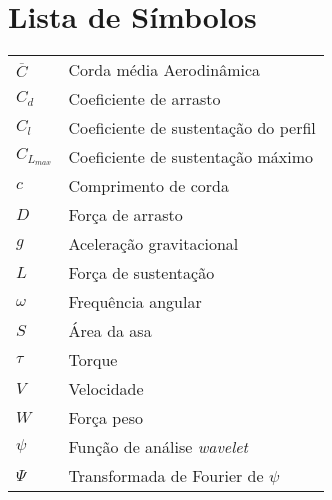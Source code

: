 \chapter{Lista de Símbolos}

\begin{tabular}{ll}
    $\overline{C}$  & Corda média Aerodinâmica \\
    $C_d$           & Coeficiente de arrasto\\
    $C_l$           & Coeficiente de sustentação do perfil\\
    $C_{L_{max}}$   & Coeficiente de sustentação máximo\\
    $c$             & Comprimento de corda\\
    $D$             & Força de arrasto\\
    $g$             & Aceleração gravitacional\\
    $L$             & Força de sustentação\\
    $\omega$        & Frequência angular\\
    $S$             & Área da asa\\
    $\tau$          & Torque\\
    $V$             & Velocidade\\
    $W$             & Força peso\\
    $\psi$ & Função de análise \textit{wavelet}\\
    $\Psi$ & Transformada de Fourier de $\psi$\\
\end{tabular}